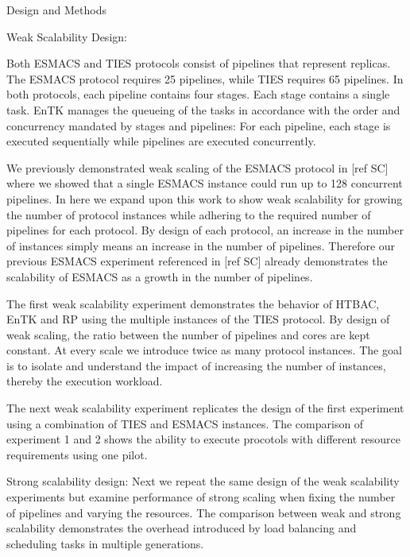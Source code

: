 Design and Methods

Weak Scalability Design: 

Both ESMACS and TIES protocols consist of pipelines that represent replicas. The ESMACS protocol requires 25 pipelines, while TIES requires 65 pipelines. In both protocols, each pipeline contains four stages. Each stage contains a single task. EnTK manages the queueing of the tasks in accordance with the order and concurrency mandated by stages and pipelines: For each pipeline, each stage is executed sequentially while pipelines are executed concurrently.  

We previously demonstrated weak scaling of the ESMACS protocol in [ref SC] where we showed that a single ESMACS instance could run up to 128 concurrent pipelines. In here we expand upon this work to show weak scalability for growing the number of protocol instances while adhering to the required number of pipelines for each protocol. By design of each protocol, an increase in the number of instances simply means an increase in the number of pipelines. Therefore our previous ESMACS experiment referenced in [ref SC] already demonstrates the scalability of ESMACS as a growth in the number of pipelines. 

The first weak scalability experiment demonstrates the behavior of HTBAC, EnTK and RP using the multiple instances of
the TIES protocol. By design of weak scaling, the ratio between the number of pipelines and cores are kept constant. At every scale we introduce twice as many protocol instances. The goal is to isolate and understand
the impact of increasing the number of instances, thereby the execution workload. 

The next weak scalability experiment replicates the design of the first experiment using a combination of TIES and ESMACS instances. The comparison of experiment 1 and 2 shows the ability to execute procotols with different resource requirements using one pilot. 

Strong scalability design: Next we repeat the same design of the weak scalability experiments but examine performance of strong scaling when fixing the number of pipelines and varying the resources. The comparison between weak and strong scalability demonstrates the overhead introduced by load balancing and scheduling tasks in multiple generations. 
	

